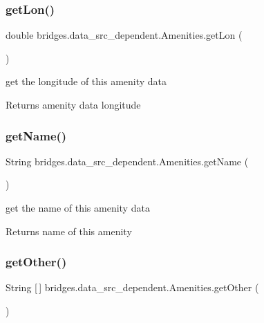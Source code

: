 \subsubsection{\texorpdfstring{get\+Lon()}{getLon()}}
{\footnotesize\ttfamily double bridges.\+data\+\_\+src\+\_\+dependent.\+Amenities.\+get\+Lon (\begin{DoxyParamCaption}{ }\end{DoxyParamCaption})}

get the longitude of this amenity data \begin{DoxyReturn}{Returns}
amenity data longitude 
\end{DoxyReturn}
\mbox{\label{classbridges_1_1data__src__dependent_1_1_amenities_a0e54ba20eee3569157b6e968c3d6c8f8}} 
\subsubsection{\texorpdfstring{get\+Name()}{getName()}}
{\footnotesize\ttfamily String bridges.\+data\+\_\+src\+\_\+dependent.\+Amenities.\+get\+Name (\begin{DoxyParamCaption}{ }\end{DoxyParamCaption})}

get the name of this amenity data \begin{DoxyReturn}{Returns}
name of this amenity 
\end{DoxyReturn}
\mbox{\label{classbridges_1_1data__src__dependent_1_1_amenities_a0b80ff1c677e97e6b68483ce4d46a0f6}} 
\subsubsection{\texorpdfstring{get\+Other()}{getOther()}}
{\footnotesize\ttfamily String \mbox{[}$\,$\mbox{]} bridges.\+data\+\_\+src\+\_\+dependent.\+Amenities.\+get\+Other (\begin{DoxyParamCaption}{ }\end{DoxyParamCaption})}

